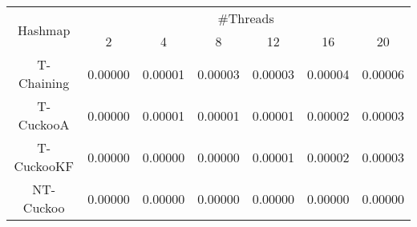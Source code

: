 \begin{tabular}{|c|c|c|c|c|c|c|}
\hline
\multirow{2}{*}{Hashmap} & \multicolumn{6}{c|}{\#Threads}\\\cline{2-7}& 2 & 4 & 8 & 12 & 16 & 20\\
\hline
\hline
T-Chaining & 0.00000 & 0.00001 & 0.00003 & 0.00003 & 0.00004 & 0.00006\\
T-CuckooA & 0.00000 & 0.00001 & 0.00001 & 0.00001 & 0.00002 & 0.00003\\
T-CuckooKF & 0.00000 & 0.00000 & 0.00000 & 0.00001 & 0.00002 & 0.00003\\
NT-Cuckoo & 0.00000 & 0.00000 & 0.00000 & 0.00000 & 0.00000 & 0.00000\\
\hline
\end{tabular}
